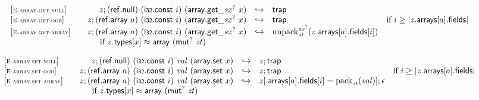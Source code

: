 \vspace{1ex}

$$
\begin{array}[t]{@{}lrcl@{}l@{}}
{[\textsc{\scriptsize E{-}array.get{-}null}]} \quad & z ; (\mathsf{ref{.}null})~(\mathsf{i{\scriptstyle 32}}{.}\mathsf{const}~i)~({\mathsf{array{.}get}}{\mathsf{\_}}{{{\mathit{sx}}^?}}~x) & \hookrightarrow & \mathsf{trap} \\
{[\textsc{\scriptsize E{-}array.get{-}oob}]} \quad & z ; (\mathsf{ref{.}array}~a)~(\mathsf{i{\scriptstyle 32}}{.}\mathsf{const}~i)~({\mathsf{array{.}get}}{\mathsf{\_}}{{{\mathit{sx}}^?}}~x) & \hookrightarrow & \mathsf{trap} & \quad \mbox{if}~ i \geq {|z{.}\mathsf{arrays}{}[a]{.}\mathsf{fields}|} \\
{[\textsc{\scriptsize E{-}array.get{-}array}]} \quad & z ; (\mathsf{ref{.}array}~a)~(\mathsf{i{\scriptstyle 32}}{.}\mathsf{const}~i)~({\mathsf{array{.}get}}{\mathsf{\_}}{{{\mathit{sx}}^?}}~x) & \hookrightarrow & {{{{\mathrm{unpack}}}_{{\mathit{zt}}}^{{{\mathit{sx}}^?}}}}{(z{.}\mathsf{arrays}{}[a]{.}\mathsf{fields}{}[i])} &  \\
& \multicolumn{4}{@{}l@{}}{\quad
\quad \mbox{if}~ z{.}\mathsf{types}{}[x] \approx \mathsf{array}~({\mathsf{mut}^?}~{\mathit{zt}})
} \\
\end{array}
$$

\vspace{1ex}

$$
\begin{array}[t]{@{}lrcl@{}l@{}}
{[\textsc{\scriptsize E{-}array.set{-}null}]} \quad & z ; (\mathsf{ref{.}null})~(\mathsf{i{\scriptstyle 32}}{.}\mathsf{const}~i)~{\mathit{val}}~(\mathsf{array{.}set}~x) & \hookrightarrow & z ; \mathsf{trap} \\
{[\textsc{\scriptsize E{-}array.set{-}oob}]} \quad & z ; (\mathsf{ref{.}array}~a)~(\mathsf{i{\scriptstyle 32}}{.}\mathsf{const}~i)~{\mathit{val}}~(\mathsf{array{.}set}~x) & \hookrightarrow & z ; \mathsf{trap} & \quad \mbox{if}~ i \geq {|z{.}\mathsf{arrays}{}[a]{.}\mathsf{fields}|} \\
{[\textsc{\scriptsize E{-}array.set{-}array}]} \quad & z ; (\mathsf{ref{.}array}~a)~(\mathsf{i{\scriptstyle 32}}{.}\mathsf{const}~i)~{\mathit{val}}~(\mathsf{array{.}set}~x) & \hookrightarrow & z{}[{.}\mathsf{arrays}{}[a]{.}\mathsf{fields}{}[i] = {{\mathrm{pack}}}_{{\mathit{zt}}}({\mathit{val}})] ; \epsilon &  \\
& \multicolumn{4}{@{}l@{}}{\quad
\quad \mbox{if}~ z{.}\mathsf{types}{}[x] \approx \mathsf{array}~({\mathsf{mut}^?}~{\mathit{zt}})
} \\
\end{array}
$$

